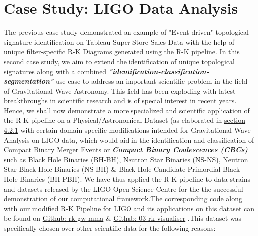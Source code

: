 \section{Case Study: LIGO Data Analysis}
\label{sec:LIGO_Data_Analysis}

The previous case study demonstrated an example of "Event-driven" topological signature identification on Tableau Super-Store Sales Data \cite{TableauSuperStore} with the help of unique filter-specific R-K Diagrams generated using the R-K pipeline. In this second case study, we aim to extend the identification of unique topological signatures along with a combined \textit{\textbf{"identification-classification-segmentation"}} use-case to address an important scientific problem in the field of Gravitational-Wave Astronomy. This field has been exploding with latest breakthroughs in scientific research and is of special interest in recent years.\cite{00.3_GravitationalWaveResearch}\cite{00.4_GWRevolution} Hence, we shall now demonstrate a more specialized and scientific application of the R-K pipeline on a  Physical/Astronomical Dataset (as elaborated in \hyperref[sec:PhysicalSystems]{section 4.2.1} with certain domain specific modifications intended for  Gravitational-Wave Analysis\cite{00.1_2012GWAnalysisFormalism} \cite{00.2_schutz2012GWDataAnalysis} on LIGO data, which would aid in the identification and classification of  Compact Binary Merger Events or \textit{\textbf{Compact Binary Coalescences (CBCs)}} \cite{24.0_BinaryMergerIdentification} \cite{24.1_BinaryMergerClassify} such as Black Hole Binaries (BH-BH), Neutron Star Binaries (NS-NS), Neutron Star-Black Hole Binaries (NS-BH) \& Black Hole-Candidate Primordial Black Hole Binaries (BH-PBH). We have thus applied the R-K pipeline to data-strains and datasets released by the LIGO Open Science Centre \cite{01.5_LIGOOpenSci} \cite{00_LIGOOpenSciData} for the the successful demonstration of our computational framework.The corresponding code along with our modified R-K Pipeline for LIGO and its applications on this dataset can be found on \href{https://github.com/animikhroy/rk_toolkit_pipeline_diagrams/tree/main/02_notebooks/rk_gw_mma}{Github: rk-gw-mma} \& \href{https://github.com/animikhroy/rk_toolkit_pipeline_diagrams/tree/main/03_rk-visualizer}{Github: 03-rk-visualiser} .This dataset was specifically chosen over other scientific data for the following reasons:

